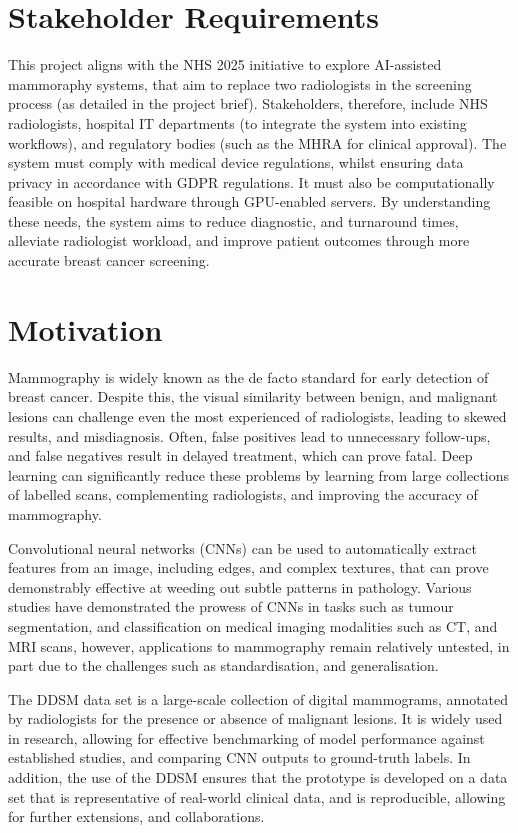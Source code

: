 \documentclass[main]{subfiles}
\begin{document}
\section{Stakeholder Requirements}
\label{sec:intro_stakeholder_requirements}
This project aligns with the NHS 2025 initiative to explore AI-assisted mammoraphy systems, that aim to replace two radiologists in the screening process (as detailed in the project brief). Stakeholders, therefore, include NHS radiologists, hospital IT departments (to integrate the system into existing workflows), and regulatory bodies (such as the MHRA for clinical approval). The system must comply with medical device regulations, whilst ensuring data privacy in accordance with GDPR regulations. It must also be computationally feasible on hospital hardware through GPU-enabled servers. By understanding these needs, the system aims to reduce diagnostic, and turnaround times, alleviate radiologist workload, and improve patient outcomes through more accurate breast cancer screening.

\section{Motivation}
\label{sec:intro_motivation}
Mammography is widely known as the de facto standard for early detection of breast cancer. Despite this, the visual similarity between benign, and malignant lesions can challenge even the most experienced of radiologists, leading to skewed results, and misdiagnosis. Often, false positives lead to unnecessary follow-ups, and false negatives result in delayed treatment, which can prove fatal. Deep learning can significantly reduce these problems by learning from large collections of labelled scans, complementing radiologists, and improving the accuracy of mammography.

Convolutional neural networks (CNNs) can be used to automatically extract features from an image, including edges, and complex textures, that can prove demonstrably effective at weeding out subtle patterns in pathology. Various studies have demonstrated the prowess of CNNs in tasks such as tumour segmentation, and classification on medical imaging modalities such as CT, and MRI scans, however, applications to mammography remain relatively untested, in part due to the challenges such as standardisation, and generalisation.

The DDSM data set is a large-scale collection of digital mammograms, annotated by radiologists for the presence or absence of malignant lesions. It is widely used in research, allowing for effective benchmarking of model performance against established studies, and comparing CNN outputs to ground-truth labels. In addition, the use of the DDSM ensures that the prototype is developed on a data set that is representative of real-world clinical data, and is reproducible, allowing for further extensions, and collaborations.
\end{document}
